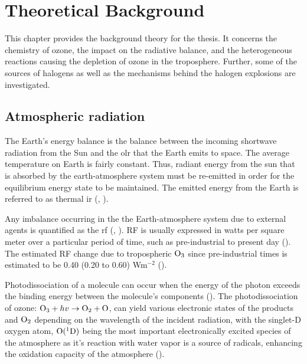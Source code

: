 \setcounter{chapter}{1} 
\chapter{Theoretical Background} \label{ch:theoretical_back}

This chapter provides the background theory for the thesis. It concerns the chemistry of ozone, the impact on the radiative balance, and the heterogeneous reactions causing the depletion of ozone in the troposphere. Further, some of the sources of halogens as well as the mechanisms behind the halogen explosions are investigated. 

\section{Atmospheric radiation}\label{sec:atm_rad}

The Earth's energy balance is the balance between the incoming shortwave radiation from the Sun and the \acrfull{olr} that the Earth emits to space. The average temperature on Earth is fairly constant. Thus, radiant energy from the sun that is absorbed by the earth-atmosphere system must be re-emitted in order for the equilibrium energy state to be maintained. The emitted energy from the Earth is referred to as thermal \acrfull{ir} (\cite{Liou_AtmRad}, \cite{SeinfeldSpyros}). 

\medskip

Any imbalance occurring in the the Earth-atmosphere system due to external agents is quantified as the \acrfull{rf} (\cite{IPCCchapter8}, \cite{Bowman2013}). RF is usually expressed in watts per square meter over a particular period of time, such as pre-industrial to present day (\cite{IPCCchapter8}). The estimated RF change due to tropospheric $\mathrm{O_3}$ since pre-industrial times is estimated to be 0.40 (0.20 to 0.60) Wm$^{-2}$ (\cite{IPCCchapter8}). 


\medskip

Photodissociation of a molecule can occur when the energy of the photon exceeds the binding energy between the molecule's components (\cite{SeinfeldSpyros}). The photodissociation of ozone: $\mathrm{O_3} + hv \rightarrow \mathrm{O_2} + \mathrm{O}$, can yield various electronic states of the products  and $\mathrm{O_2}$ depending on the wavelength of the incident radiation, with the singlet-D oxygen atom, $\mathrm{O}(^1\mathrm{D})$ being the most important electronically excited species of the atmosphere as it's reaction with water vapor is a source of  radicals, enhancing the oxidation capacity of the atmosphere (\cite{SeinfeldSpyros}).


